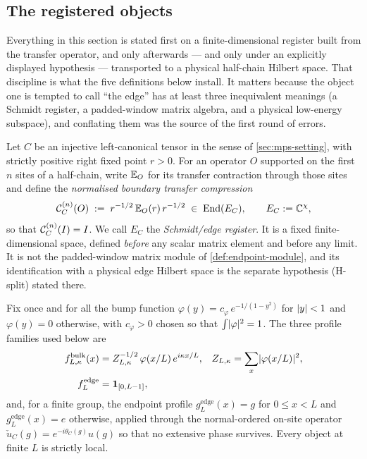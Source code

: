 \subsection{The registered objects}

Everything in this section is stated first on a finite-dimensional register
built from the transfer operator, and only afterwards --- and only under an
explicitly displayed hypothesis --- transported to a physical half-chain
Hilbert space. That discipline is what the five definitions below install. It
matters because the object one is tempted to call ``the edge'' has at least
three inequivalent meanings (a Schmidt register, a padded-window matrix
algebra, and a physical low-energy subspace), and conflating them was the
source of the first round of errors.

\begin{definition}\label{def:soft-registers}
Let $C$ be an injective left-canonical tensor in the sense of
\cref{sec:mps-setting}, with strictly positive right fixed point $r>0$. For an
operator $O$ supported on the first $n$ sites of a half-chain, write
$\mathbb{E}_O$ for its transfer contraction through those sites and define the
\emph{normalised boundary transfer compression}
\begin{equation}
  \mathcal{C}_C^{(n)}(O) \;:=\; r^{-1/2}\,\mathbb{E}_O(r)\,r^{-1/2}
  \;\in\;\operatorname{End}(E_C),
  \qquad E_C:=\mathbb{C}^{\chi},
  \label{eq:spt-compression}
\end{equation}
so that $\mathcal{C}_C^{(n)}(I)=I$. We call $E_C$ the \emph{Schmidt/edge register}.
It is a fixed finite-dimensional space, defined \emph{before} any scalar
matrix element and before any limit. It is not the padded-window matrix module
of \cref{def:endpoint-module}, and its identification with a physical edge
Hilbert space is the separate hypothesis (H-split) stated there.

Fix once and for all the bump function $\varphi(y)=c_\varphi\,
e^{-1/(1-y^{2})}$ for $\lvert y\rvert<1$ and $\varphi(y)=0$ otherwise, with
$c_\varphi>0$ chosen so that $\int\lvert \varphi\rvert^{2}=1$. The three profile
families used below are
\begin{align}
  f^{\mathrm{bulk}}_{L,\kappa}(x)
    &= Z_{L,\kappa}^{-1/2}\,\varphi(x/L)\,e^{i\kappa x/L},
  &Z_{L,\kappa}&=\sum_x\lvert \varphi(x/L)\rvert^{2},
  \label{eq:spt-bulk-profile}\\
  f^{\mathrm{edge}}_{L}
    &= \mathbf 1_{[0,L-1]},
  \label{eq:spt-edge-profile}
\end{align}
and, for a finite group, the endpoint profile $g^{\mathrm{edge}}_L(x)=g$ for
$0\le x<L$ and $g^{\mathrm{edge}}_L(x)=e$ otherwise, applied through the
normal-ordered on-site operator $\check u_C(g)=e^{-i\theta_C(g)}u(g)$ so that
no extensive phase survives. Every object at finite $L$ is strictly local.


\end{definition}
